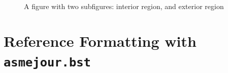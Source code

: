 \documentclass[subscriptcorrection,upint,varvw,mathalfa=cal=euler,barcolor=black,balance,hyphenate,french,pdf-a,nolists]{asmejour}
\begin{document}
\begin{figure}[t]
\begin{subfigure}[t]{0.5\textwidth} %
\vbox{
\vspace*{1.7em}
\vspace*{1.7em}
}
\subcaption{\label{fig:interior-region}}
\end{subfigure}%
\begin{subfigure}[t]{0.5\textwidth} %
\end{subfigure}%
\caption{A figure with two subfigures:  interior region, and  exterior region \cite{Lienhard2019b}\label{fig:2}}
\end{figure}



\section{Reference Formatting with \texttt{asmejour.bst}}
\end{document}
